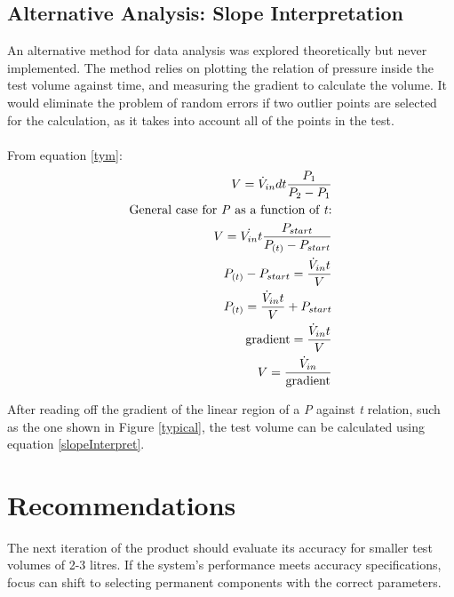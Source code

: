 \documentclass{report}
\begin{document}
\subsection{Alternative Analysis: Slope Interpretation}
An alternative method for data analysis was explored theoretically but never implemented. The method relies on plotting the relation of pressure inside the test volume against time, and measuring the gradient to calculate the volume. It would eliminate the problem of random errors if two outlier points are selected for the calculation, as it takes into account all of the points in the test.\\ \\
From equation \ref{tym}:
\begin{eqnarray} \label{slopeDerivation}
V = \dot{V}_{in} dt \frac{P_1}{P_2 - P_1} \nonumber \\
\text{General case for \textit{P} as a function of \textit{t}:} \nonumber \\
V = \dot{V_{in}} t \frac{P_{start}}{P_{(t)} - P_{start}}\nonumber \\
P_{(t)} -P_{start} = \frac{\dot{V}_{in}t}{V} \nonumber \\
P_{(t)} = \frac{\dot{V}_{in}t}{V} +P_{start} \\
\text{gradient} = \frac{\dot{V}_{in}t}{V} \nonumber \\
V = \frac{\dot{V}_{in}}{\text{gradient}} \label{slopeInterpret}
\end{eqnarray}

After reading off the gradient of the linear region of a \textit{P} against \textit{t} relation, such as the one shown in Figure \ref{typical}, the test volume can be calculated using equation \ref{slopeInterpret}.



\section{Recommendations}
The next iteration of the product should evaluate its accuracy for smaller test volumes of 2-3 litres. If the system's performance meets accuracy specifications, focus can shift to selecting permanent components with the correct parameters.
\end{document}
